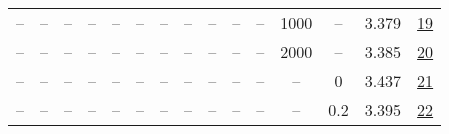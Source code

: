 \begin{table}[H]
\begin{tabular}{ccccccccccccccc}
-- & -- & -- & -- & -- & -- & -- & -- & -- & -- & -- & 1000 & -- & 3.379 & \href{https://wandb.ai/stanford-mercury/optimizer-scaling/runs/sweep-130m-5B-soapd4deb1lr0.016-wd0.1-minlr0-warmup1000-b10.95-b-dffc7d}{19} \\
-- & -- & -- & -- & -- & -- & -- & -- & -- & -- & -- & 2000 & -- & 3.385 & \href{https://wandb.ai/stanford-mercury/optimizer-scaling/runs/sweep-130m-5B-soap2ca73elr0.016-wd0.1-minlr0-warmup2000-b10.95-b-c4669e}{20} \\
-- & -- & -- & -- & -- & -- & -- & -- & -- & -- & -- & -- & 0 & 3.437 & \href{https://wandb.ai/stanford-mercury/optimizer-scaling/runs/sweep-130m-5B-soapfe4525lr0.016-wd0-minlr0-warmup500-b10.95-b20.-17d13a}{21} \\
-- & -- & -- & -- & -- & -- & -- & -- & -- & -- & -- & -- & 0.2 & 3.395 & \href{https://wandb.ai/stanford-mercury/optimizer-scaling/runs/sweep-130m-5B-soap6e3d9clr0.016-wd0.2-minlr0-warmup500-b10.95-b2-a74b2f}{22} \\
\bottomrule
\end{tabular}
\end{table}

